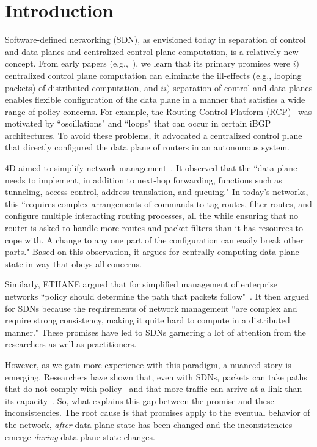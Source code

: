 \section{Introduction}
\label{sec:intro}

Software-defined networking (SDN), as envisioned today in separation of control and data planes and centralized control plane computation, is a relatively new concept.
From early papers (e.g.,~\cite{rcp-case,rcp,4d,ethane}), we learn that its primary promises were $i)$ centralized control plane computation can eliminate the ill-effects (e.g., looping packets) of distributed computation, and $ii)$ separation of control and data planes enables flexible configuration of the data plane in a manner that satisfies a wide range of policy concerns.
For example, the Routing Control Platform (RCP)~\cite{rcp-case,rcp} was motivated by ``oscillations" and ``loops" that can occur in certain iBGP architectures. To avoid these problems, it advocated a centralized control plane that directly configured the data plane of routers in an autonomous system.

4D aimed to simplify network management~\cite{4d}. It observed that the ``data plane needs to implement, in addition to next-hop forwarding, functions such as tunneling, access control, address translation, and queuing." In today's networks, this ``requires complex arrangements of commands to tag routes, filter routes, and configure multiple interacting routing processes, all the while ensuring that no router is asked to handle more routes and packet filters than it has resources to cope with. A change to any one part of the configuration can easily break other parts." Based on this observation, it argues for centrally computing data plane state in way that obeys all concerns.

Similarly, ETHANE argued that for simplified management of enterprise networks ``policy should determine the path that packets follow"~\cite{ethane}. It then argued for SDNs because the requirements of network management ``are complex and require strong consistency, making it quite hard to compute in a distributed manner." These promises have led to SDNs garnering a lot of attention from the researchers as well as practitioners.

However, as we gain more experience with this paradigm, a nuanced story is emerging.  Researchers have shown that, even with SDNs, packets can take paths that do not comply with policy~\cite{safeupdate} and that more traffic can arrive at a link than its capacity~\cite{swan}. So, what explains this gap between the promise and these inconsistencies. The root cause is that promises apply to the eventual behavior of the network, {\em after} data plane state has been changed and the inconsistencies emerge {\em during} data plane state changes.

